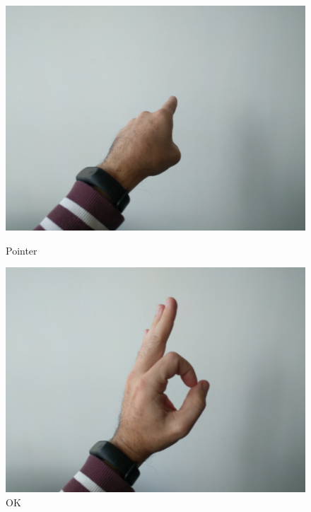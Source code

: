 \begin{figure}[!htb]
	\begin{minipage}[c]{.32\linewidth}
		\includegraphics[width=\columnwidth]{figures/1.jpg}%
		\caption*{Pointer}%
	\end{minipage} \hfill
	\begin{minipage}[c]{.32\linewidth}
		\includegraphics[width=\columnwidth]{figures/2.jpg}%
		\caption*{OK}%
	\end{minipage} \hfill
	\begin{minipage}[c]{.32\linewidth}

\end{minipage}
\end{figure}
